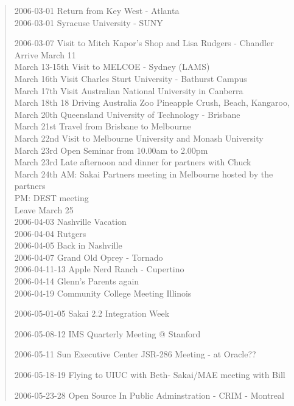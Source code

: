 \begin{quote}
2006-03-01 Return from Key West - Atlanta\\
2006-03-01 Syracuse University - SUNY

2006-03-07 Visit to Mitch Kapor's Shop and Lisa Rudgers - Chandler\\

Arrive March 11\\
March 13-15th Visit to MELCOE - Sydney (LAMS)\\
March 16th Visit Charles Sturt University - Bathurst Campus\\
March 17th Visit Australian National University in Canberra\\
March 18th 18 Driving Australia Zoo Pineapple Crush, Beach, Kangaroo,\\
March 20th Queensland University of Technology - Brisbane\\
March 21st Travel from Brisbane to Melbourne\\
March 22nd Visit to Melbourne University and Monash University\\
March 23rd Open Seminar  from 10.00am to 2.00pm\\
March 23rd Late afternoon and dinner for partners with Chuck\\
March 24th AM: Sakai Partners meeting in Melbourne hosted by the partners\\
           PM: DEST meeting\\
Leave March 25\\

2006-04-03 Nashville Vacation\\
2006-04-04 Rutgers\\
2006-04-05 Back in Nashville\\
2006-04-07 Grand Old Oprey - Tornado\\

2006-04-11-13 Apple Nerd Ranch - Cupertino\\
2006-04-14 Glenn's Parents again\\

2006-04-19 Community College Meeting Illinois

2006-05-01-05 Sakai 2.2 Integration Week

2006-05-08-12 IMS Quarterly Meeting @ Stanford 

2006-05-11 Sun Executive Center JSR-286 Meeting - at Oracle?? 

2006-05-18-19 Flying to UIUC with Beth- Sakai/MAE meeting with Bill

2006-05-23-28 Open Source In Public Adminstration - CRIM - Montreal


\end{quote}
